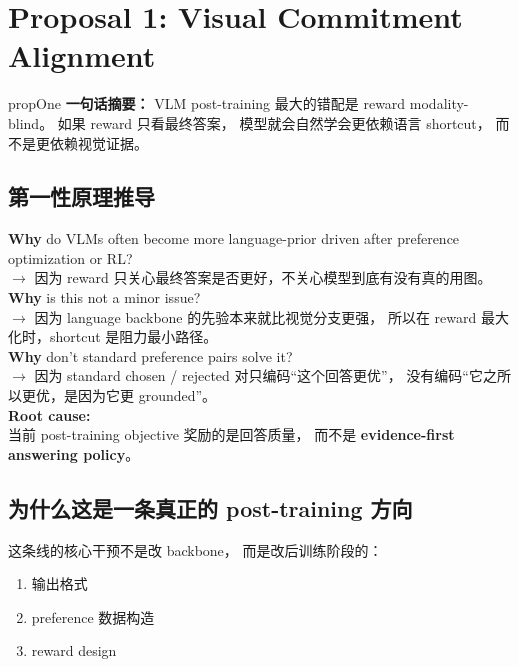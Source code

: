 \documentclass[12pt,a4paper]{article}
\begin{document}
\newpage
\section{Proposal 1: Visual Commitment Alignment}

\begin{proposalbox}{propOne}
\textbf{一句话摘要：}
VLM post-training 最大的错配是 reward modality-blind。
如果 reward 只看最终答案，
模型就会自然学会更依赖语言 shortcut，
而不是更依赖视觉证据。
\end{proposalbox}

\subsection{第一性原理推导}

\begin{whybox}
\textbf{Why} do VLMs often become more language-prior driven after preference optimization or RL?\\
$\rightarrow$ 因为 reward 只关心最终答案是否更好，不关心模型到底有没有真的用图。\\[3pt]
\textbf{Why} is this not a minor issue?\\
$\rightarrow$ 因为 language backbone 的先验本来就比视觉分支更强，
所以在 reward 最大化时，shortcut 是阻力最小路径。\\[3pt]
\textbf{Why} don't standard preference pairs solve it?\\
$\rightarrow$ 因为 standard chosen / rejected 对只编码``这个回答更优''，
没有编码``它之所以更优，是因为它更 grounded''。\\[3pt]
\textbf{Root cause:}\\
当前 post-training objective 奖励的是回答质量，
而不是 \textbf{evidence-first answering policy}。
\end{whybox}

\subsection{为什么这是一条真正的 post-training 方向}

这条线的核心干预不是改 backbone，
而是改后训练阶段的：
\begin{enumerate}[leftmargin=2em]
  \item 输出格式
  \item preference 数据构造
  \item reward design
\end{enumerate}
\end{document}
